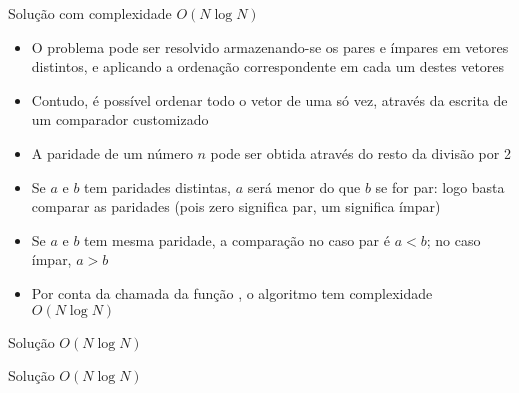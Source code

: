 \begin{frame}[fragile]{Solução com complexidade $O(N\log N)$}

    \begin{itemize}
        \item O problema pode ser resolvido armazenando-se os pares e ímpares em
            vetores distintos, e aplicando a ordenação correspondente em cada um destes
            vetores

        \item Contudo, é possível ordenar todo o vetor de uma só vez, através da
            escrita de um comparador customizado

        \item A paridade de um número $n$ pode ser obtida através do resto da divisão por 2

        \item Se $a$ e $b$ tem paridades distintas, $a$ será menor do que $b$ se for par:
            logo basta comparar as paridades (pois zero significa par, um significa ímpar)

        \item Se $a$ e $b$ tem mesma paridade, a comparação no caso par é $a < b$; no caso 
            ímpar, $a > b$

        \item Por conta da chamada da função , o algoritmo tem complexidade
            $O(N\log N)$

    \end{itemize}

\end{frame}

\begin{frame}[fragile]{Solução $O(N\log N)$}
\end{frame}

\begin{frame}[fragile]{Solução $O(N\log N)$}
\end{frame}
